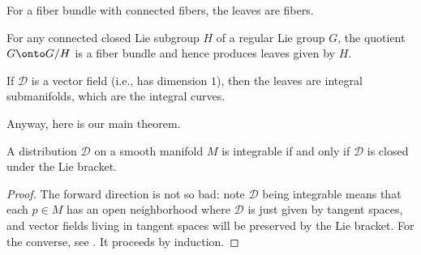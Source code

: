 \documentclass[../notes.tex]{subfiles}
\begin{document}
\begin{example}
	For a fiber bundle with connected fibers, the leaves are fibers.
\end{example}
\begin{example}
	For any connected closed Lie subgroup $H$ of a regular Lie group $G$, the quotient $G\onto G/H$ is a fiber bundle and hence produces leaves given by $H$.
\end{example}
\begin{example}
	If $\mathcal D$ is a vector field (i.e., has dimension $1$), then the leaves are integral submanifolds, which are the integral curves.
\end{example}
Anyway, here is our main theorem.
\begin{theorem}[Frobenius] \label{thm:frobenius}
	A distribution $\mathcal D$ on a smooth manifold $M$ is integrable if and only if $\mathcal D$ is closed under the Lie bracket.
\end{theorem}
\begin{proof}
	The forward direction is not so bad: note $\mathcal D$ being integrable means that each $p\in M$ has an open neighborhood where $\mathcal D$ is just given by tangent spaces, and vector fields living in tangent spaces will be preserved by the Lie bracket. For the converse, see \cite[Theorem~19.12]{lee-manifolds}. It proceeds by induction.
\end{proof}
\end{document}
